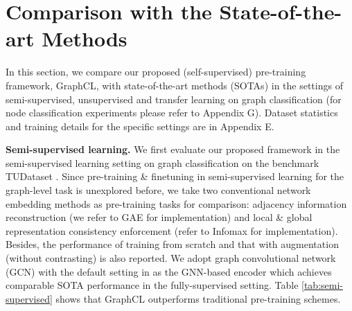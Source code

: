 \section{Comparison with the State-of-the-art Methods}
\label{sec:exp_sota}
In this section, we compare our proposed (self-supervised) pre-training framework, GraphCL, with state-of-the-art methods (SOTAs) in the settings of semi-supervised, unsupervised \cite{sun2019infograph} and transfer learning \cite{hu2019pre} on graph classification (for node classification experiments please refer to Appendix G).
Dataset statistics and training details for the specific settings are in Appendix E.

\textbf{Semi-supervised learning.}
We first evaluate our proposed framework in the semi-supervised learning setting on graph classification \cite{chen2019powerful,xu2018powerful} on the benchmark TUDataset \cite{Morris+2020}.
Since pre-training \& finetuning in semi-supervised learning for the graph-level task is unexplored before, we take two conventional network embedding methods as pre-training tasks for comparison:
adjacency information reconstruction (we refer to GAE \cite{kipf2016variational} for implementation) and local \& global representation consistency enforcement (refer to Infomax \cite{sun2019infograph} for implementation).
Besides, the performance of training from scratch and that with augmentation (without contrasting) is also reported.
We adopt graph convolutional network (GCN) with the default setting in \cite{chen2019powerful} as the GNN-based encoder which achieves comparable SOTA performance in the fully-supervised setting.
Table \ref{tab:semi-supervised} shows that GraphCL outperforms  traditional pre-training schemes.

